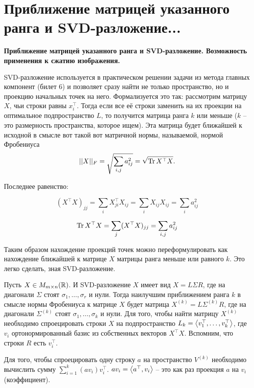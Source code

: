 \section{
 Приближение матрицей указанного ранга и SVD-разложение...
}

\textbf{Приближение матрицей указанного ранга и SVD-разложение. Возможность применения к сжатию изображения.}

SVD-разложение используется в практическом решении задачи из метода главных компонент (билет 6) и позволяет сразу найти не только пространство, но и проекцию начальных точек на него. Формализуется это так: рассмотрим матрицу $X$, чьи строки равны $x_i^{\top}$. Тогда если все её строки заменить на их проекции на оптимальное подпространство $L$, то получится матрица ранга $k$ или меньше ($k$ -- это размерность пространства, которое ищем). Эта матрица будет ближайшей к исходной в смысле вот такой вот матричной нормы, называемой, нормой Фробениуса 
$$||X||_F=\sqrt{\sum_{i,j} a_{ij}^2}=\sqrt{\operatorname{Tr} X^{\top}X}.$$

Последнее равенство:

$$(X^{\top}X)_{jj} = \sum\limits_{i} X^{\top}_{ji}X_{ij} = \sum\limits_{i} X_{ij}X_{ij} = \sum\limits_{i} a_{ij}^2$$

$$\operatorname{Tr} X^{\top}X = \sum\limits_{j} (X^{\top}X)_{jj} = \sum\limits_{i,j} a_{ij}^2$$

Таким образом нахождение проекций точек можно переформулировать как нахождение ближайшей к матрице $X$ матрицы ранга меньше или равного $k$. Это легко сделать, зная SVD-разложение.

\thrm Пусть $X\in M_{m\times n}(\mathbb{R})$. И SVD-разложение $X$ имеет вид $X=L\Sigma R$, где на диагонали $\Sigma$ стоят $\sigma_1,\dots,\sigma_r$ и нули. Тогда наилучшим приближением ранга $k$ в смысле нормы Фробениуса к матрице $X$ будет матрица $X^{(k)}=L\Sigma^{(k)}R$, где на диагонали $\Sigma^{(k)}$ стоят $\sigma_1,\dots,\sigma_{k}$ и нули.
\proof Для того, чтобы найти матрицу $X^{(k)}$ необходимо спроецировать строки $X$ на подпространство $L_k=\left\langle v_1^{\top},\dots,v_k^{\top}\right\rangle$, где $v_i$ ортонормированный базис из собственных векторов $X^{\top}X$.  Вспомним, что строки $R$ есть $v_i^{\top}$.

Для того, чтобы спроецировать одну строку $a$ на пространство $V^{(k)}$ необходимо вычислить сумму $\sum_{i=1}^k (av_i) v_i^{\top}$. $av_i = \left\langle a^{\top}, v_i \right\rangle$ -- это как раз проекция $a$ на $v_i$ (коэффициент).

